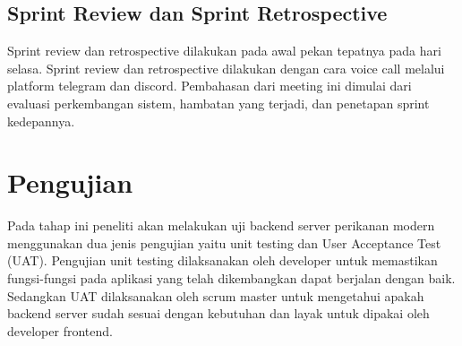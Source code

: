 	\subsection{Sprint Review dan Sprint Retrospective}
	
	Sprint review dan retrospective dilakukan pada awal pekan tepatnya pada hari selasa. Sprint review dan retrospective dilakukan dengan cara voice call melalui platform telegram dan discord. Pembahasan dari meeting ini dimulai dari evaluasi perkembangan sistem, hambatan yang terjadi, dan penetapan sprint kedepannya.
		
\section{Pengujian}
Pada tahap ini peneliti akan melakukan uji backend server perikanan modern menggunakan dua jenis pengujian yaitu unit testing dan User Acceptance Test (UAT). Pengujian unit testing dilaksanakan oleh developer untuk memastikan fungsi-fungsi pada aplikasi yang telah dikembangkan dapat berjalan dengan baik. Sedangkan UAT dilaksanakan oleh scrum master untuk mengetahui apakah backend server sudah sesuai dengan kebutuhan dan layak untuk dipakai oleh developer frontend.

